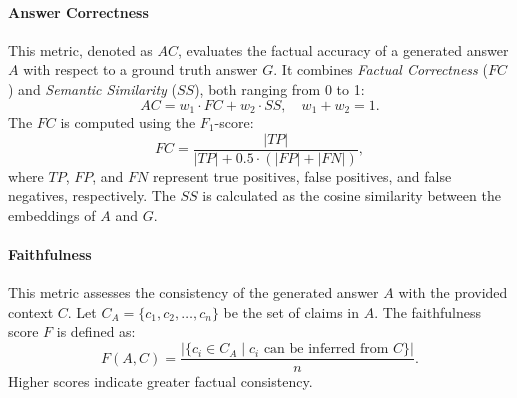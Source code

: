 \paragraph{Answer Correctness}
This metric, denoted as \(AC\), evaluates the factual accuracy of a generated answer \(A\) with respect to a ground truth answer \(G\).
%
It combines \textit{Factual Correctness} (\(FC\)) and \textit{Semantic Similarity} (\(SS\)), both ranging from 0 to 1:
%
\begin{equation}
    \label{eq:answer-correctness}
    AC = w_1 \cdot FC + w_2 \cdot SS, \quad w_1 + w_2 = 1.
\end{equation}
%
The \(FC\) is computed using the \(F_1\)-score:
%
\begin{equation}
    \label{eq:factual-correctness}
    FC = \frac{|TP|}{|TP| + 0.5 \cdot (|FP| + |FN|)},
\end{equation}
%
where \(TP\), \(FP\), and \(FN\) represent true positives, false positives, and false negatives, respectively.
%
The \(SS\) is calculated as the cosine similarity between the embeddings of \(A\) and \(G\).

\paragraph{Faithfulness}
This metric assesses the consistency of the generated answer \(A\) with the provided context \(C\).
%
Let \(C_A = \{c_1, c_2, \dots, c_n\}\) be the set of claims in \(A\).
%
The faithfulness score \(F\) is defined as:
%
\begin{equation}
    \label{eq:faithfulness}
    F(A, C) = \frac{|\{c_i \in C_A \mid c_i \text{ can be inferred from } C\}|}{n}.
\end{equation}
%
Higher scores indicate greater factual consistency.

